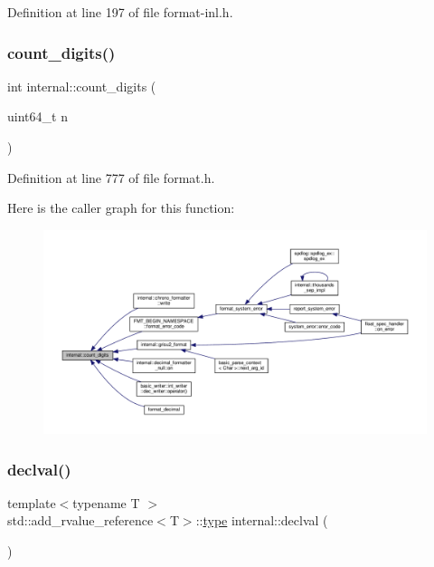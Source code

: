 Definition at line 197 of file format-\/inl.\+h.

\mbox{\label{namespaceinternal_a24a563e36236186f38e75ecf47a819ea}} 
\subsubsection{\texorpdfstring{count\+\_\+digits()}{count\_digits()}}
{\footnotesize\ttfamily int internal\+::count\+\_\+digits (\begin{DoxyParamCaption}\item[{uint64\+\_\+t}]{n }\end{DoxyParamCaption})\hspace{0.3cm}{\ttfamily [inline]}}



Definition at line 777 of file format.\+h.

Here is the caller graph for this function\+:
\nopagebreak
\begin{figure}[H]
\begin{center}
\leavevmode
\includegraphics[width=350pt]{namespaceinternal_a24a563e36236186f38e75ecf47a819ea_icgraph}
\end{center}
\end{figure}
\mbox{\label{namespaceinternal_a5f61aadb1d6afc8b79ef7ea57c39eafc}} 
\subsubsection{\texorpdfstring{declval()}{declval()}}
{\footnotesize\ttfamily template$<$typename T $>$ \\
std\+::add\+\_\+rvalue\+\_\+reference$<$T$>$\+::\hyperlink{namespaceinternal_a8661864098ac0acff9a6dd7e66f59038}{type} internal\+::declval (\begin{DoxyParamCaption}{ }\end{DoxyParamCaption})}

